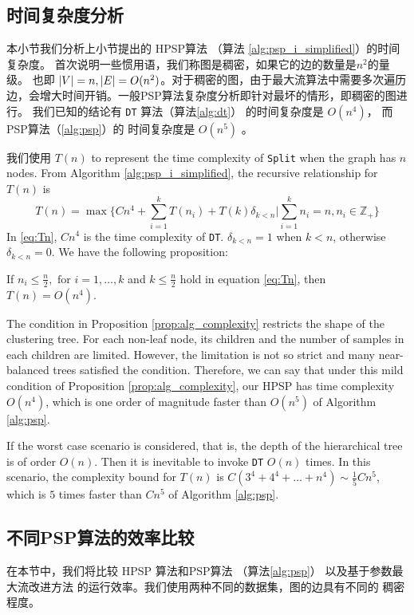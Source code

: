 \subsection{时间复杂度分析}

本小节我们分析上小节提出的 HPSP算法 （算法 \ref{alg:psp_i_simplified}）的时间复杂度。
首次说明一些惯用语，我们称图是稠密，如果它的边的数量是$n^2$的量级。
也即 $\lvert V\rvert = n, \lvert E\rvert = O(n^2)$。对于稠密的图，由于最大流算法中需要多次遍历
边，会增大时间开销。一般PSP算法复杂度分析即针对最坏的情形，即稠密的图进行。
我们已知的结论有 \texttt{DT} 算法（算法\ref{alg:dt}）
的时间复杂度是 $O(n^4)$， 而 PSP算法（\ref{alg:psp}）的 
时间复杂度是 $O(n^5)$ \citep{pin}。

我们使用 $T(n)$ to represent the time complexity of \texttt{Split} when the graph has $n$ nodes.
From Algorithm \ref{alg:psp_i_simplified}, the recursive relationship for $T(n)$ is
\begin{equation}\label{eq:Tn}
T(n) = \max \{ C n^4 + \sum_{i=1}^k T(n_i) + T(k)\delta_{k<n} | \sum_{i=1}^k n_i = n, n_i \in \mathbb{Z}_{+} \}
\end{equation}	
In \eqref{eq:Tn}, $Cn^4$ is the time complexity of \texttt{DT}. $\delta_{k<n} = 1$ when $k<n$, otherwise $\delta_{k<n}=0$. We have the following proposition:
\begin{proposition}\label{prop:alg_complexity}
	 If $n_i \leq \frac{n}{2}, \textrm{ for } i=1,\dots,k$ and $ k \leq \frac{n}{2}$  hold in equation \eqref{eq:Tn}, then $T(n) = O(n^4)$.
\end{proposition}

The condition in Proposition \ref{prop:alg_complexity} restricts the shape of the clustering tree. For each non-leaf node, its children and the number of samples in each children are limited. However, the limitation is not so strict and
many near-balanced trees satisfied the condition. Therefore, we can say that under this mild condition of Proposition \ref{prop:alg_complexity},
our HPSP has time complexity $O(n^4)$, which is one order of magnitude faster than $O(n^5)$ of Algorithm \ref{alg:psp}.

If the worst case scenario is considered, that is, the depth of the hierarchical tree is of order $O(n)$. Then it is inevitable to invoke \texttt{DT} $O(n)$ times.
In this scenario, the complexity bound for $T(n)$ is $C(3^4+4^4 + \dots + n^4) \sim \frac{1}{5}Cn^5$, which is $5$ times faster than $Cn^5$ of Algorithm \ref{alg:psp}.

\subsection{不同PSP算法的效率比较}
在本节中，我们将比较 HPSP 算法和PSP算法
（算法\ref{alg:psp}）
以及基于参数最大流改进方法\cite{kolmogorov}
的运行效率。我们使用两种不同的数据集，图的边具有不同的
稠密程度。

